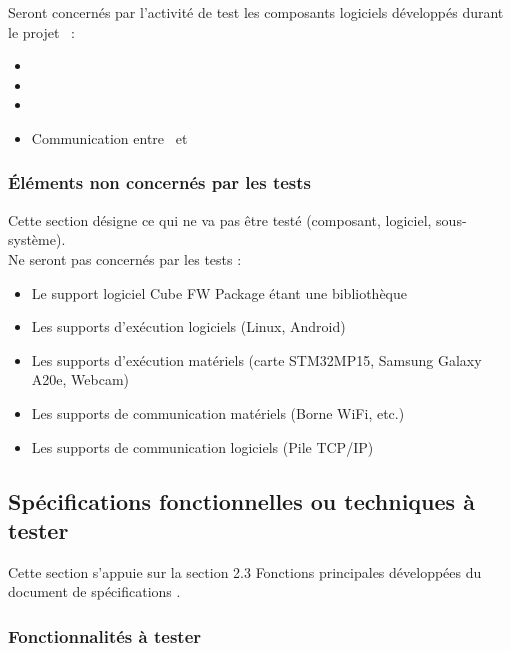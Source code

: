 Seront concernés par l'activité de test les composants logiciels développés durant le projet \projet~: 
\begin{itemize}
    \item \appliLin
    \item \appliPo
    \item \appliA
    \item Communication entre \appliA~et \appliLin
\end{itemize}

\subsubsection{Éléments non concernés par les tests}
\label{sec:peri:comp:nontest}

Cette section désigne ce qui ne va pas être testé (composant, logiciel, sous-système).\\

Ne seront pas concernés par les tests :
\begin{itemize}
    \item Le support logiciel Cube FW Package étant une bibliothèque
    \item Les supports d'exécution logiciels (Linux, Android)
    \item Les supports d'exécution matériels (carte STM32MP15, Samsung Galaxy A20e, Webcam)
    \item Les supports de communication matériels (Borne WiFi, etc.)
    \item Les supports de communication logiciels (Pile TCP/IP)
\end{itemize}

\subsection{Spécifications fonctionnelles ou techniques à tester}
\label{sec:peri:spec}


Cette section s'appuie sur la section 2.3 Fonctions principales développées du document de spécifications . 

\subsubsection{Fonctionnalités à tester}
\label{sec:peri:fct:test}


